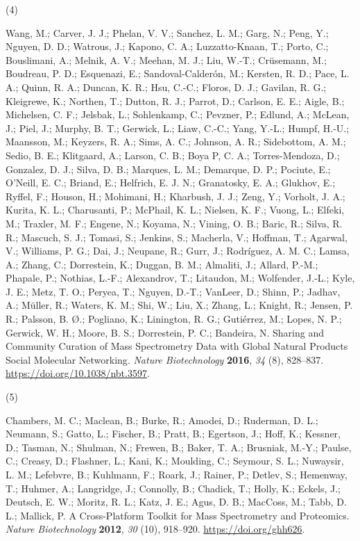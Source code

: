 \documentclass[
]{article}
\newlength{\cslhangindent}
\newlength{\csllabelwidth}
\newlength{\cslentryspacingunit} %
\newenvironment{CSLReferences}[2] %
 {%
  \setlength{\parindent}{0pt}
  \ifodd #1
  \let\oldpar\par
  \def\par{\hangindent=\cslhangindent\oldpar}
  \fi
  \setlength{\parskip}{#2\cslentryspacingunit}
 }%
 {}
\newcommand{\CSLLeftMargin}[1]{\parbox[t]{\csllabelwidth}{#1}}
\newcommand{\CSLRightInline}[1]{\parbox[t]{\linewidth - \csllabelwidth}{#1}\break}
\begin{document}
\begin{CSLReferences}{0}{0}
\leavevmode{}%
\CSLLeftMargin{(4) }%
\CSLRightInline{Wang, M.; Carver, J. J.; Phelan, V. V.; Sanchez, L. M.;
Garg, N.; Peng, Y.; Nguyen, D. D.; Watrous, J.; Kapono, C. A.;
Luzzatto-Knaan, T.; Porto, C.; Bouslimani, A.; Melnik, A. V.; Meehan, M.
J.; Liu, W.-T.; Crüsemann, M.; Boudreau, P. D.; Esquenazi, E.;
Sandoval-Calderón, M.; Kersten, R. D.; Pace, L. A.; Quinn, R. A.;
Duncan, K. R.; Hsu, C.-C.; Floros, D. J.; Gavilan, R. G.; Kleigrewe, K.;
Northen, T.; Dutton, R. J.; Parrot, D.; Carlson, E. E.; Aigle, B.;
Michelsen, C. F.; Jelsbak, L.; Sohlenkamp, C.; Pevzner, P.; Edlund, A.;
McLean, J.; Piel, J.; Murphy, B. T.; Gerwick, L.; Liaw, C.-C.; Yang,
Y.-L.; Humpf, H.-U.; Maansson, M.; Keyzers, R. A.; Sims, A. C.; Johnson,
A. R.; Sidebottom, A. M.; Sedio, B. E.; Klitgaard, A.; Larson, C. B.;
Boya P, C. A.; Torres-Mendoza, D.; Gonzalez, D. J.; Silva, D. B.;
Marques, L. M.; Demarque, D. P.; Pociute, E.; O'Neill, E. C.; Briand,
E.; Helfrich, E. J. N.; Granatosky, E. A.; Glukhov, E.; Ryffel, F.;
Houson, H.; Mohimani, H.; Kharbush, J. J.; Zeng, Y.; Vorholt, J. A.;
Kurita, K. L.; Charusanti, P.; McPhail, K. L.; Nielsen, K. F.; Vuong,
L.; Elfeki, M.; Traxler, M. F.; Engene, N.; Koyama, N.; Vining, O. B.;
Baric, R.; Silva, R. R.; Mascuch, S. J.; Tomasi, S.; Jenkins, S.;
Macherla, V.; Hoffman, T.; Agarwal, V.; Williams, P. G.; Dai, J.;
Neupane, R.; Gurr, J.; Rodríguez, A. M. C.; Lamsa, A.; Zhang, C.;
Dorrestein, K.; Duggan, B. M.; Almaliti, J.; Allard, P.-M.; Phapale, P.;
Nothias, L.-F.; Alexandrov, T.; Litaudon, M.; Wolfender, J.-L.; Kyle, J.
E.; Metz, T. O.; Peryea, T.; Nguyen, D.-T.; VanLeer, D.; Shinn, P.;
Jadhav, A.; Müller, R.; Waters, K. M.; Shi, W.; Liu, X.; Zhang, L.;
Knight, R.; Jensen, P. R.; Palsson, B. Ø.; Pogliano, K.; Linington, R.
G.; Gutiérrez, M.; Lopes, N. P.; Gerwick, W. H.; Moore, B. S.;
Dorrestein, P. C.; Bandeira, N. Sharing and Community Curation of Mass
Spectrometry Data with {Global Natural Products Social Molecular
Networking}. \emph{Nature Biotechnology} \textbf{2016}, \emph{34} (8),
828--837. \url{https://doi.org/10.1038/nbt.3597}.}

\leavevmode{}%
\CSLLeftMargin{(5) }%
\CSLRightInline{Chambers, M. C.; Maclean, B.; Burke, R.; Amodei, D.;
Ruderman, D. L.; Neumann, S.; Gatto, L.; Fischer, B.; Pratt, B.;
Egertson, J.; Hoff, K.; Kessner, D.; Tasman, N.; Shulman, N.; Frewen,
B.; Baker, T. A.; Brusniak, M.-Y.; Paulse, C.; Creasy, D.; Flashner, L.;
Kani, K.; Moulding, C.; Seymour, S. L.; Nuwaysir, L. M.; Lefebvre, B.;
Kuhlmann, F.; Roark, J.; Rainer, P.; Detlev, S.; Hemenway, T.; Huhmer,
A.; Langridge, J.; Connolly, B.; Chadick, T.; Holly, K.; Eckels, J.;
Deutsch, E. W.; Moritz, R. L.; Katz, J. E.; Agus, D. B.; MacCoss, M.;
Tabb, D. L.; Mallick, P. A Cross-Platform Toolkit for Mass Spectrometry
and Proteomics. \emph{Nature Biotechnology} \textbf{2012}, \emph{30}
(10), 918--920. \url{https://doi.org/ghh626}.}


\end{CSLReferences}
\end{document}
